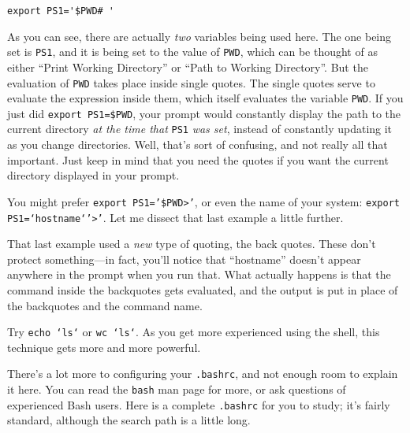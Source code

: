 \begin{screen}\begin{verbatim}
export PS1='$PWD# '
\end{verbatim}\end{screen}

As you can see, there are actually {\em two} variables being
used here.  The one being set is {\tt PS1}, and it is being set to the
value of {\tt PWD}, which can be thought of as either ``Print Working
Directory'' or ``Path to Working Directory''.  But the evaluation of
{\tt PWD} takes place inside single quotes.  The single quotes serve
to evaluate the expression inside them, which itself evaluates the
variable {\tt PWD}.  If you just did {\tt export~PS1=\$PWD}, your
prompt would constantly display the path to the current directory {\em
  at the time that\/} {\tt PS1} {\em was set\/}, instead of constantly
updating it as you change directories.  Well, that's sort of
confusing, and not really all that important.  Just keep in mind that
you need the quotes if you want the current directory displayed in
your prompt.

You might prefer {\tt export PS1='\$PWD>'}, or even the name of your
system: {\tt export PS1=`hostname`'>'}. Let me dissect that last
example a little further.

That last example used a {\em new\/} type of quoting, the back
quotes. These don't protect something---in fact, you'll notice that
``hostname'' doesn't appear anywhere in the prompt when you run
that. What actually happens is that the command inside the backquotes
gets evaluated, and the output is put in place of the backquotes and
the command name. 

Try {\tt echo `ls`} or {\tt wc `ls`}. As you get more experienced
using the shell, this technique gets more and more powerful.


There's a lot more to configuring your {\tt .bashrc}, and not enough
room to explain it here.  You can read the {\tt bash} man page for
more, or ask questions of experienced Bash users.  Here is a complete
{\tt .bashrc} for you to study; it's fairly standard, although the
search path is a little long.

